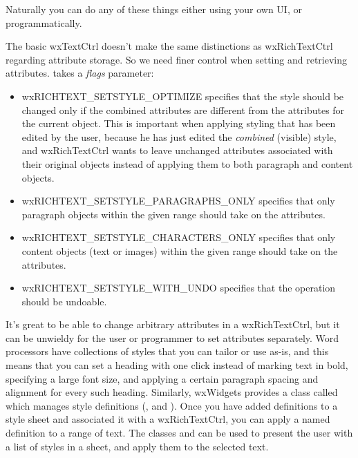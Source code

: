 Naturally you can do any of these things either using your own UI, or programmatically.

The basic wxTextCtrl doesn't make the same distinctions as wxRichTextCtrl regarding
attribute storage. So we need finer control when setting and retrieving
attributes.  takes a {\it flags} parameter:

\begin{itemize}\itemsep=0pt
\item wxRICHTEXT\_SETSTYLE\_OPTIMIZE specifies that the style should be changed only if
the combined attributes are different from the attributes for the current object. This is important when
applying styling that has been edited by the user, because he has just edited the {\it combined} (visible)
style, and wxRichTextCtrl wants to leave unchanged attributes associated with their original objects
instead of applying them to both paragraph and content objects.
\item wxRICHTEXT\_SETSTYLE\_PARAGRAPHS\_ONLY specifies that only paragraph objects within the given range
should take on the attributes.
\item wxRICHTEXT\_SETSTYLE\_CHARACTERS\_ONLY specifies that only content objects (text or images) within the given range
should take on the attributes.
\item wxRICHTEXT\_SETSTYLE\_WITH\_UNDO specifies that the operation should be undoable.
\end{itemize}

It's great to be able to change arbitrary attributes in a wxRichTextCtrl, but
it can be unwieldy for the user or programmer to set attributes separately. Word processors have collections
of styles that you can tailor or use as-is, and this means that you can set a heading with one click
instead of marking text in bold, specifying a large font size, and applying a certain
paragraph spacing and alignment for every such heading. Similarly,
wxWidgets provides a class called  which manages style definitions
(,  and ).
Once you have added definitions to a style sheet and associated it with a wxRichTextCtrl,
you can apply a named definition to a range of text. The classes \rtfsp
and  can be used to present the user with a list
of styles in a sheet, and apply them to the selected text.

